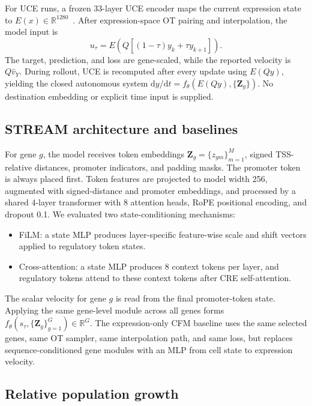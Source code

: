 \documentclass[11pt]{article}
\newcommand{\uce}{UCE}
\newcommand{\dd}{\mathrm{d}}
\begin{document}
For \uce{} runs, a frozen 33-layer \uce{} encoder maps the current expression
state to $E(x)\in\mathbb{R}^{1280}$~\cite{rosen2026uce}. After expression-space
OT pairing and interpolation, the model input is
\begin{equation}
u_\tau=E\left(Q[(1-\tau)y_k+\tau y_{k+1}]\right).
\end{equation}
The target, prediction, and loss are gene-scaled, while the reported velocity
is $Q\hat v_Y$. During rollout, \uce{} is recomputed after every update using
$E(Qy)$, yielding the closed autonomous system
$\dd y/\dd t=f_\theta(E(Qy),\{\mathbf Z_g\})$. No destination embedding or
explicit time input is supplied.

\subsection{STREAM architecture and baselines}

For gene $g$, the model receives token embeddings
$\mathbf{Z}_g=\{z_{gm}\}_{m=1}^{M}$, signed TSS-relative distances, promoter
indicators, and padding masks. The promoter token is always placed first. Token
features are projected to model width 256, augmented with signed-distance and
promoter embeddings, and processed by a shared 4-layer transformer with 8
attention heads, RoPE positional encoding, and dropout 0.1. We evaluated two
state-conditioning mechanisms:

\begin{itemize}
\item FiLM: a state MLP produces layer-specific feature-wise scale and shift
vectors applied to regulatory token states.
\item Cross-attention: a state MLP produces 8 context tokens per layer, and
regulatory tokens attend to these context tokens after CRE self-attention.
\end{itemize}

The scalar velocity for gene $g$ is read from the final promoter-token state.
Applying the same gene-level module across all genes forms
$f_\theta(s_\tau,\{\mathbf{Z}_g\}_{g=1}^{G})\in\mathbb{R}^{G}$. The
expression-only CFM baseline uses the same selected genes, same OT sampler,
same interpolation path, and same loss, but replaces sequence-conditioned gene
modules with an MLP from cell state to expression velocity.

\subsection{Relative population growth}
\end{document}
